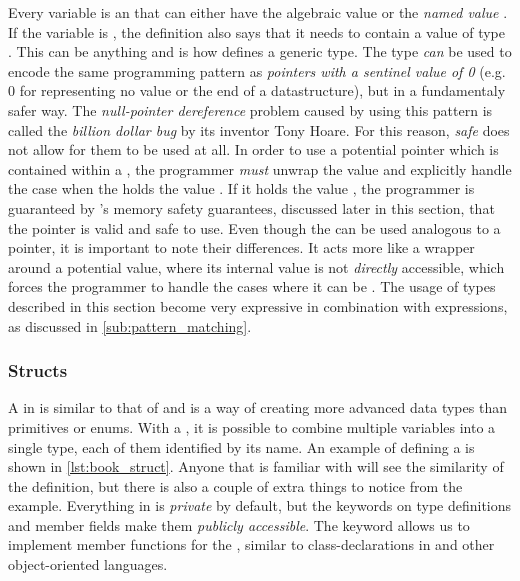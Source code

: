 Every  variable is an {\enum} that can either have the algebraic value  or the \emph{named value} .
If the variable is , the definition also says that it needs to contain a value of type .
This  can be anything and is how {\rust} defines a generic type.
The  type \emph{can} be used to encode the same programming pattern as \emph{pointers with a sentinel value of 0} (e.g. 0 for representing no value or the end of a datastructure), but in a fundamentaly safer way.
The \emph{null-pointer dereference} problem caused by using this pattern is called the \emph{billion dollar bug} by its inventor Tony Hoare.
For this reason, \emph{safe} {\rust} does not allow for them to be used at all.
In order to use a potential pointer which is contained within a , the programmer \emph{must} unwrap the value and explicitly handle the case when the  holds the value .
If it holds the value , the programmer is guaranteed by {\rust}'s memory safety guarantees, discussed later in this section, that the pointer is valid and safe to use.
Even though the  can be used analogous to a {\C} pointer, it is important to note their differences.
It acts more like a wrapper around a potential value, where its internal value is not \emph{directly} accessible, which forces the programmer to handle the cases where it can be .
The usage of {\enum} types described in this section become very expressive in combination with  expressions, as discussed in \autoref{sub:pattern_matching}.

\subsubsection{Structs}
\label{ssub:structs}

A  in {\rust} is similar to that of {\C} and is a way of creating more advanced data types than primitives or enums.
With a , it is possible to combine multiple variables into a single type, each of them identified by its name.
An example of defining a  is shown in \autoref{lst:book_struct}.
Anyone that is familiar with {\C} will see the similarity of the  definition, but there is also a couple of extra things to notice from the example.
Everything in {\rust} is \emph{private} by default, but the  keywords on type definitions and member fields make them \emph{publicly accessible}.
The  keyword allows us to implement member functions for the , similar to class-declarations in {\Cpp} and other object-oriented languages.

